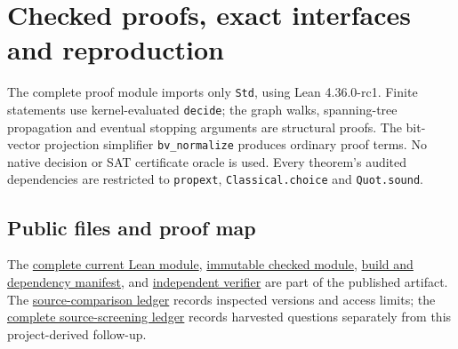\section{Checked proofs, exact interfaces and reproduction}\label{app:lean}
The complete proof module imports only \texttt{Std}, using Lean 4.36.0-rc1.
Finite statements use kernel-evaluated \texttt{decide}; the graph walks,
spanning-tree propagation and eventual stopping arguments are structural
proofs. The bit-vector projection simplifier \texttt{bv\_normalize} produces
ordinary proof terms. No native decision or SAT certificate oracle is used.
Every theorem's audited dependencies are restricted to \texttt{propext},
\texttt{Classical.choice} and \texttt{Quot.sound}.

\subsection{Public files and proof map}
The
\href{https://github.com/alectionary/vibe-math/blob/master/formalization/gallager-b-absorbing/connected/Connected.lean}{complete current Lean module},
\href{https://github.com/alectionary/vibe-math/blob/65bcfe0d8573a392f250295fcfa3619b586e4159/formalization/gallager-b-absorbing/connected/Connected.lean}{immutable checked module},
\href{https://github.com/alectionary/vibe-math/blob/master/formalization/gallager-b-absorbing/connected/verification.json}{build and dependency manifest}, and
\href{https://github.com/alectionary/vibe-math/blob/master/formalization/gallager-b-absorbing/connected/verify.py}{independent verifier}
are part of the published artifact. The
\href{https://github.com/alectionary/vibe-math/blob/master/formalization/gallager-b-absorbing/connected/prior-art.json}{source-comparison ledger}
records inspected versions and access limits; the
\href{https://github.com/alectionary/vibe-math/blob/master/literature/connected-gallager-source-screening.json}{complete source-screening ledger}
records harvested questions separately from this project-derived follow-up.


